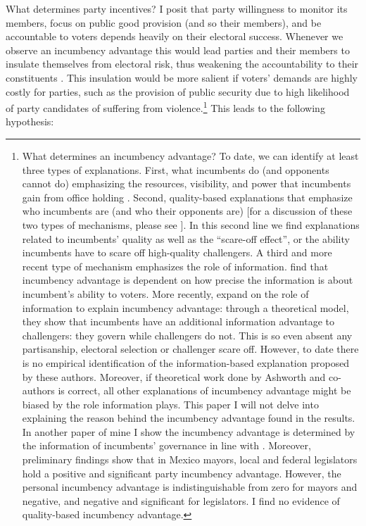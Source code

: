 \documentclass[12pt]{amsart}
\numberwithin{equation}{section}
\theoremstyle{definition}
\theoremstyle{definition}
\theoremstyle{definition}
\begin{document}
What determines party incentives? I posit that party willingness to monitor its members, focus on public good provision (and so their members), and be accountable to voters depends heavily on their electoral success. Whenever we observe an incumbency advantage this would lead parties and their members to insulate themselves from electoral risk, thus weakening the accountability to their constituents \citep{cox_katz_2002}. This insulation would be more salient if voters' demands are highly costly for parties, such as the provision of public security due to high likelihood of party candidates of suffering from violence.\footnote{What determines an incumbency advantage? To date, we can identify at least three types of explanations.  First, what incumbents do (and opponents cannot do) emphasizing the resources, visibility, and power that incumbents gain from office holding \citep{mayhew_1974, fiorina_1989, king_1991, cox_morgensten_1993}. Second, quality-based explanations that emphasize who incumbents are (and who their opponents are) \citep{cox_katz_1996, levitt_wolfram_1997, ansolabehere_snyder_2000} [for a discussion of these two types of mechanisms, please see \citet{eggers_2017}]. In this second line we find explanations related to incumbents’ quality as well as the “scare-off effect”, or the ability incumbents have to scare off high-quality challengers. A third and more recent type of mechanism emphasizes the role of information. \citep{ashworth_bdm_2008} find that incumbency advantage is dependent on how precise the information is about incumbent’s ability to voters. More recently, \citep{ashworth_etal_2019} expand on the role of information to explain incumbency advantage: through a theoretical model, they show that incumbents have an additional information advantage to challengers: they govern while challengers do not. This is so even absent any partisanship, electoral selection or challenger scare off. However, to date there is no empirical identification of the information-based explanation proposed by these authors. Moreover, if theoretical work done by Ashworth and co-authors is correct, all other explanations of incumbency advantage might be biased by the role information plays. This paper I will not delve into explaining the reason behind the incumbency advantage found in the results. In another paper of mine I show the incumbency advantage is determined by the information of incumbents’ governance in line with \citet{ashworth_etal_2019}. Moreover, preliminary findings show that in Mexico mayors, local and federal legislators hold a positive and significant party incumbency advantage. However, the personal incumbency advantage is indistinguishable from zero for mayors and negative, and negative and significant for legislators. I find no evidence of quality-based incumbency advantage.} This leads to the following hypothesis:
\\
\end{document}
